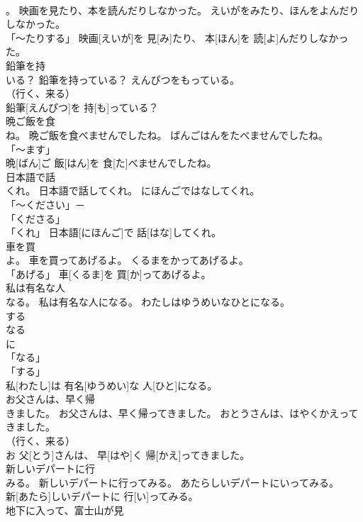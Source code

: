 \documentclass[8pt]{extreport}
\begin{document}
\begin{CJK}{UTF8}{min}
\\	。	映画を見たり、本を読んだりしなかった。	えいがをみたり、ほんをよんだりしなかった。	
\\	「～たりする」	映画[えいが]を 見[み]たり、 本[ほん]を 読[よ]んだりしなかった。		
\\	鉛筆を持
\\	いる？	鉛筆を持っている？	えんぴつをもっている。	
\\	（行く、来る） 
\\	鉛筆[えんぴつ]を 持[も]っている？		
\\	晩ご飯を食
\\	ね。	晩ご飯を食べませんでしたね。	ばんごはんをたべませんでしたね。	
\\	「～ます」 
\\	晩[ばん]ご 飯[はん]を 食[た]べませんでしたね。		
\\	日本語で話
\\	くれ。	日本語で話してくれ。	にほんごではなしてくれ。	
\\	「～ください」－ 
\\	「くださる」 
\\	「くれ」	日本語[にほんご]で 話[はな]してくれ。		
\\	車を買
\\	よ。	車を買ってあげるよ。	くるまをかってあげるよ。	
\\	「あげる」	車[くるま]を 買[か]ってあげるよ。		
\\	私は有名な人
\\	なる。	私は有名な人になる。	わたしはゆうめいなひとになる。	
\\	する 
\\	なる 
\\	に 
\\	「なる」 
\\	「する」 
\\	私[わたし]は 有名[ゆうめい]な 人[ひと]になる。		
\\	お父さんは、早く帰
\\	きました。	お父さんは、早く帰ってきました。	おとうさんは、はやくかえってきました。	
\\	（行く、来る） 
\\	お 父[とう]さんは、 早[はや]く 帰[かえ]ってきました。		
\\	新しいデパートに行
\\	みる。	新しいデパートに行ってみる。	あたらしいデパートにいってみる。	
\\	新[あたら]しいデパートに 行[い]ってみる。		
\\	地下に入って、富士山が見

\end{CJK}
\end{document}

